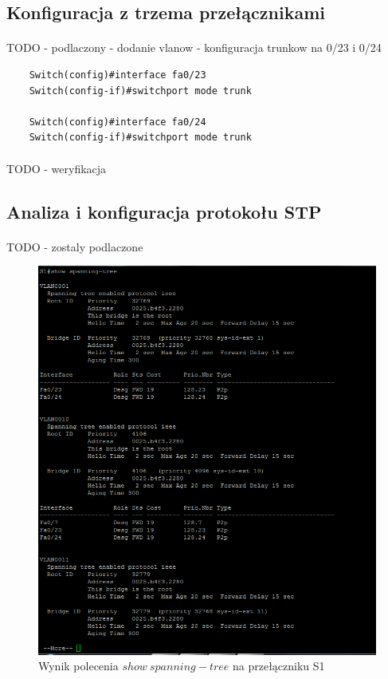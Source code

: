 \documentclass[wide,a4paper,titlepage,12pt] {article}
\begin{document}
  \subsection{Konfiguracja z trzema przełącznikami}
  \paragraph{}
  TODO - podlaczony
  - dodanie vlanow
  - konfiguracja trunkow na 0/23 i 0/24

  \begin{verbatim}
    Switch(config)#interface fa0/23
    Switch(config-if)#switchport mode trunk

    Switch(config)#interface fa0/24
    Switch(config-if)#switchport mode trunk
  \end{verbatim}

  \paragraph{}
  TODO - weryfikacja

  \subsection{Analiza i konfiguracja protokołu STP}
  \paragraph{}
  TODO - zostaly podlaczone

  \begin{figure}[htbp]
    \begin{center}
      \includegraphics[width=\textwidth]{img/t13.PNG}
      \caption{Wynik polecenia $show\ spanning-tree$ na przełączniku S1}
    \end{center}
  \end{figure}
\end{document}
